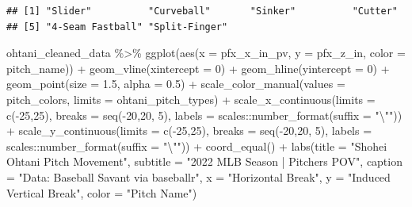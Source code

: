 \documentclass[
  11pt,
]{book}
\newenvironment{Shaded}{\begin{snugshade}}{\end{snugshade}}
\newcommand{\AttributeTok}[1]{\textcolor[rgb]{0.77,0.63,0.00}{#1}}
\newcommand{\DecValTok}[1]{\textcolor[rgb]{0.00,0.00,0.81}{#1}}
\newcommand{\FloatTok}[1]{\textcolor[rgb]{0.00,0.00,0.81}{#1}}
\newcommand{\FunctionTok}[1]{\textcolor[rgb]{0.00,0.00,0.00}{#1}}
\newcommand{\NormalTok}[1]{#1}
\newcommand{\SpecialCharTok}[1]{\textcolor[rgb]{0.00,0.00,0.00}{#1}}
\newcommand{\StringTok}[1]{\textcolor[rgb]{0.31,0.60,0.02}{#1}}
\theoremstyle{definition}
\theoremstyle{definition}
\theoremstyle{definition}
\theoremstyle{definition}
\theoremstyle{remark}
\begin{document}
\begin{verbatim}
## [1] "Slider"          "Curveball"       "Sinker"          "Cutter"         
## [5] "4-Seam Fastball" "Split-Finger"
\end{verbatim}

\newpage

\begin{Shaded}
\begin{Highlighting}[]
\NormalTok{ohtani\_cleaned\_data }\SpecialCharTok{\%\textgreater{}\%} 
  \FunctionTok{ggplot}\NormalTok{(}\FunctionTok{aes}\NormalTok{(}\AttributeTok{x =}\NormalTok{ pfx\_x\_in\_pv, }\AttributeTok{y =}\NormalTok{ pfx\_z\_in, }\AttributeTok{color =}\NormalTok{ pitch\_name)) }\SpecialCharTok{+}
  \FunctionTok{geom\_vline}\NormalTok{(}\AttributeTok{xintercept =} \DecValTok{0}\NormalTok{) }\SpecialCharTok{+}
  \FunctionTok{geom\_hline}\NormalTok{(}\AttributeTok{yintercept =} \DecValTok{0}\NormalTok{) }\SpecialCharTok{+}
  \FunctionTok{geom\_point}\NormalTok{(}\AttributeTok{size =} \FloatTok{1.5}\NormalTok{, }\AttributeTok{alpha =} \FloatTok{0.5}\NormalTok{) }\SpecialCharTok{+}
  \FunctionTok{scale\_color\_manual}\NormalTok{(}\AttributeTok{values =}\NormalTok{ pitch\_colors,}
                     \AttributeTok{limits =}\NormalTok{ ohtani\_pitch\_types) }\SpecialCharTok{+}
  \FunctionTok{scale\_x\_continuous}\NormalTok{(}\AttributeTok{limits =} \FunctionTok{c}\NormalTok{(}\SpecialCharTok{{-}}\DecValTok{25}\NormalTok{,}\DecValTok{25}\NormalTok{),}
                     \AttributeTok{breaks =} \FunctionTok{seq}\NormalTok{(}\SpecialCharTok{{-}}\DecValTok{20}\NormalTok{,}\DecValTok{20}\NormalTok{, }\DecValTok{5}\NormalTok{),}
                     \AttributeTok{labels =}\NormalTok{ scales}\SpecialCharTok{::}\FunctionTok{number\_format}\NormalTok{(}\AttributeTok{suffix =} \StringTok{"}\SpecialCharTok{\textbackslash{}"}\StringTok{"}\NormalTok{)) }\SpecialCharTok{+}
  \FunctionTok{scale\_y\_continuous}\NormalTok{(}\AttributeTok{limits =} \FunctionTok{c}\NormalTok{(}\SpecialCharTok{{-}}\DecValTok{25}\NormalTok{,}\DecValTok{25}\NormalTok{),}
                     \AttributeTok{breaks =} \FunctionTok{seq}\NormalTok{(}\SpecialCharTok{{-}}\DecValTok{20}\NormalTok{,}\DecValTok{20}\NormalTok{, }\DecValTok{5}\NormalTok{),}
                     \AttributeTok{labels =}\NormalTok{ scales}\SpecialCharTok{::}\FunctionTok{number\_format}\NormalTok{(}\AttributeTok{suffix =} \StringTok{"}\SpecialCharTok{\textbackslash{}"}\StringTok{"}\NormalTok{)) }\SpecialCharTok{+}
  \FunctionTok{coord\_equal}\NormalTok{() }\SpecialCharTok{+}
  \FunctionTok{labs}\NormalTok{(}\AttributeTok{title =} \StringTok{"Shohei Ohtani Pitch Movement"}\NormalTok{,}
       \AttributeTok{subtitle =} \StringTok{"2022 MLB Season | Pitcher\textquotesingle{}s POV"}\NormalTok{,}
       \AttributeTok{caption =} \StringTok{"Data: Baseball Savant via baseballr"}\NormalTok{, }
       \AttributeTok{x =} \StringTok{"Horizontal Break"}\NormalTok{,}
       \AttributeTok{y =} \StringTok{"Induced Vertical Break"}\NormalTok{,}
       \AttributeTok{color =} \StringTok{"Pitch Name"}\NormalTok{)}
\end{Highlighting}
\end{Shaded}
\end{document}
